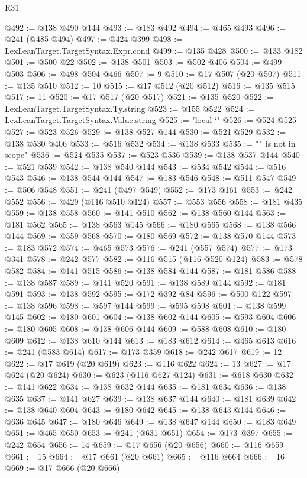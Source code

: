 \begin{lexlean}{R31}
\begin{coremodule}
@492 := @138 @490 @144
@493 := @183 @492
@494 := @465 @493
@496 := @241 (@485 @494)
@497 := @424 @399
@498 := LexLeanTarget.TargetSyntax.Expr.cond
@499 := @135 @428
@500 := @133 @182
@501 := @500 @22
@502 := @138 @501
@503 := @502 @406
@504 := @499 @503
@506 := @498 @504 @466
@507 := 9
@510 := @17 @507 (@20 @507)
@511 := @135 @510
@512 := 10
@515 := @17 @512 (@20 @512)
@516 := @135 @515
@517 := 11
@520 := @17 @517 (@20 @517)
@521 := @135 @520
@522 := LexLeanTarget.TargetSyntax.Ty.string
@523 := @155 @522
@524 := LexLeanTarget.TargetSyntax.Value.string
@525 := "local `"
@526 := @524 @525
@527 := @523 @526
@529 := @138 @527 @144
@530 := @521 @529
@532 := @138 @530 @406
@533 := @516 @532
@534 := @138 @533
@535 := "` is not in scope"
@536 := @524 @535
@537 := @523 @536
@539 := @138 @537 @144
@540 := @521 @539
@542 := @138 @540 @144
@543 := @534 @542
@544 := @516 @543
@546 := @138 @544 @144
@547 := @183 @546
@548 := @511 @547
@549 := @506 @548
@551 := @241 (@497 @549)
@552 := @173 @161
@553 := @242 @552
@556 := @429 (@116 @510 @124)
@557 := @553 @556
@558 := @181 @435
@559 := @138 @558
@560 := @141 @510
@562 := @138 @560 @144
@563 := @181 @562
@565 := @138 @563 @145
@566 := @180 @565
@568 := @138 @566 @144
@569 := @559 @568
@570 := @180 @569
@572 := @138 @570 @144
@573 := @183 @572
@574 := @465 @573
@576 := @241 (@557 @574)
@577 := @173 @341
@578 := @242 @577
@582 := @116 @515 (@116 @520 @124)
@583 := @578 @582
@584 := @141 @515
@586 := @138 @584 @144
@587 := @181 @586
@588 := @138 @587
@589 := @141 @520
@591 := @138 @589 @144
@592 := @181 @591
@593 := @138 @592
@595 := @172 @392 @84
@596 := @500 @122
@597 := @138 @596
@598 := @597 @144
@599 := @595 @598
@601 := @138 @599 @145
@602 := @180 @601
@604 := @138 @602 @144
@605 := @593 @604
@606 := @180 @605
@608 := @138 @606 @144
@609 := @588 @608
@610 := @180 @609
@612 := @138 @610 @144
@613 := @183 @612
@614 := @465 @613
@616 := @241 (@583 @614)
@617 := @173 @359
@618 := @242 @617
@619 := 12
@622 := @17 @619 (@20 @619)
@623 := @116 @622
@624 := 13
@627 := @17 @624 (@20 @624)
@630 := @623 (@116 @627 @124)
@631 := @618 @630
@632 := @141 @622
@634 := @138 @632 @144
@635 := @181 @634
@636 := @138 @635
@637 := @141 @627
@639 := @138 @637 @144
@640 := @181 @639
@642 := @138 @640 @604
@643 := @180 @642
@645 := @138 @643 @144
@646 := @636 @645
@647 := @180 @646
@649 := @138 @647 @144
@650 := @183 @649
@651 := @465 @650
@653 := @241 (@631 @651)
@654 := @173 @397
@655 := @242 @654
@656 := 14
@659 := @17 @656 (@20 @656)
@660 := @116 @659
@661 := 15
@664 := @17 @661 (@20 @661)
@665 := @116 @664
@666 := 16
@669 := @17 @666 (@20 @666)

\end{coremodule}
\end{lexlean}
